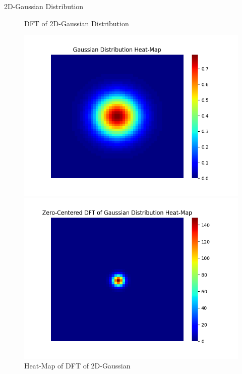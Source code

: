 \documentclass[8pt]{beamer}
\begin{document}
\begin{frame}[allowframebreaks]{2D-Gaussian Distribution}
\begin{figure}[ht]
\begin{minipage}[b]{0.45\textwidth}
        \caption{DFT of 2D-Gaussian Distribution}
        \label{fig:DGD}
    \end{minipage}
\end{figure}
\framebreak
\begin{figure}[ht]
    \begin{minipage}[b]{0.45\textwidth}
        \includegraphics[scale=0.35]{../Images/Gaussian_HeatMap.png}
        \caption{Heat-Map of 2D-Gaussian}
        \label{fig:GDH}
    \end{minipage}
    \begin{minipage}[b]{0.45\textwidth}
        \includegraphics[scale=0.35]{../Images/ZeroCentered_Gaussian_DFT_HeatMap.png}
        \caption{Heat-Map of DFT of 2D-Gaussian}
        \label{fig:DGDH}
    \end{minipage}
\end{figure}
\end{frame}
\end{document}
